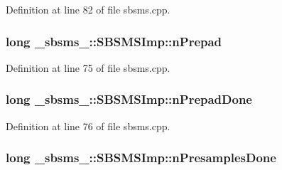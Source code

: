 Definition at line 82 of file sbsms.\+cpp.

\subsubsection[{\texorpdfstring{n\+Prepad}{nPrepad}}]{\setlength{\rightskip}{0pt plus 5cm}long \+\_\+sbsms\+\_\+\+::\+S\+B\+S\+M\+S\+Imp\+::n\+Prepad\hspace{0.3cm}{\ttfamily [protected]}}\hypertarget{class__sbsms___1_1_s_b_s_m_s_imp_a34ba3b055c49b299f72f3acdf7d85af2}{}\label{class__sbsms___1_1_s_b_s_m_s_imp_a34ba3b055c49b299f72f3acdf7d85af2}


Definition at line 75 of file sbsms.\+cpp.

\subsubsection[{\texorpdfstring{n\+Prepad\+Done}{nPrepadDone}}]{\setlength{\rightskip}{0pt plus 5cm}long \+\_\+sbsms\+\_\+\+::\+S\+B\+S\+M\+S\+Imp\+::n\+Prepad\+Done\hspace{0.3cm}{\ttfamily [protected]}}\hypertarget{class__sbsms___1_1_s_b_s_m_s_imp_a093ad9df18ed58d771bd312feaf33a4c}{}\label{class__sbsms___1_1_s_b_s_m_s_imp_a093ad9df18ed58d771bd312feaf33a4c}


Definition at line 76 of file sbsms.\+cpp.

\subsubsection[{\texorpdfstring{n\+Presamples\+Done}{nPresamplesDone}}]{\setlength{\rightskip}{0pt plus 5cm}long \+\_\+sbsms\+\_\+\+::\+S\+B\+S\+M\+S\+Imp\+::n\+Presamples\+Done\hspace{0.3cm}{\ttfamily [protected]}}\hypertarget{class__sbsms___1_1_s_b_s_m_s_imp_a3b779535c5510798dd1362fda5104089}{}\label{class__sbsms___1_1_s_b_s_m_s_imp_a3b779535c5510798dd1362fda5104089}


